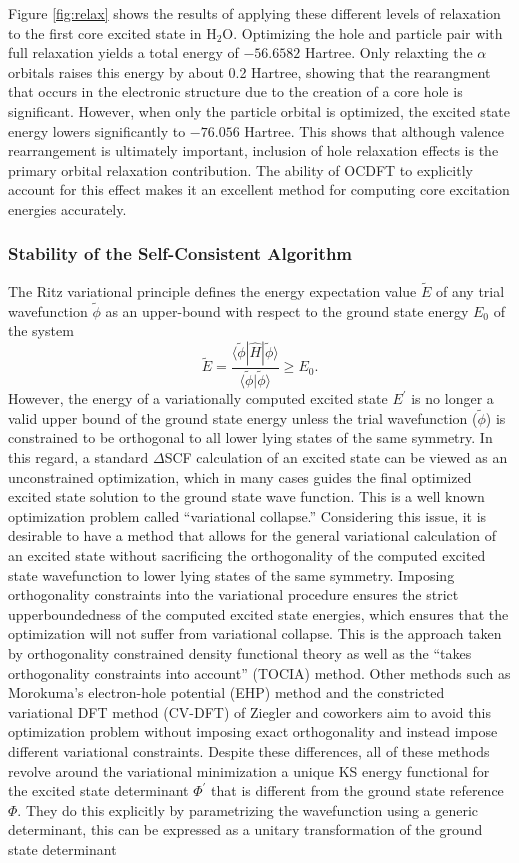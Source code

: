 \documentclass[final]{emory}
\begin{document}
Figure \ref{fig:relax} shows the results of applying these different levels of relaxation to the first core excited state in H$_2$O. Optimizing the hole and particle pair with full relaxation yields a total energy of $- 56.6582$ Hartree. Only relaxting the $\alpha$ orbitals raises this energy by about 0.2 Hartree, showing that the rearangment that occurs in the electronic structure due to the creation of a core hole is significant. However, when only the particle orbital is optimized, the excited state energy lowers significantly to $-76.056$ Hartree. This shows that although valence rearrangement is ultimately important, inclusion of hole relaxation effects is the primary orbital relaxation contribution. The ability of OCDFT to explicitly account for this effect makes it an excellent method for computing core excitation energies accurately. 
\subsubsection{Stability of the Self-Consistent Algorithm}
The Ritz variational principle defines the energy expectation value $\tilde{E}$ of any trial wavefunction $\tilde{\phi}$ as an upper-bound with respect to the ground state energy $E_0$ of the system
\begin{equation}
\tilde{E} = \frac{\langle \tilde{\phi}| \hat{H} | \tilde{\phi}\rangle}{\langle\tilde{\phi}|\tilde{\phi}\rangle} \geq E_0.
\end{equation} 
However, the energy of a variationally computed excited state $E^{\prime}$ is no longer a valid upper bound of the ground state energy unless the trial wavefunction ($\tilde{\phi}$) is constrained to be orthogonal to all lower lying states of the same symmetry. In this regard, a standard $\Delta$SCF calculation of an excited state can be viewed as an unconstrained optimization, which in many cases guides the final optimized excited state solution to the ground state wave function. This is a well known optimization problem called ``variational collapse.'' Considering this issue, it is desirable to have a method that allows for the general variational calculation of an excited state without sacrificing the orthogonality of the computed excited state wavefunction to lower lying states of the same symmetry. Imposing orthogonality constraints into the variational procedure ensures the strict upperboundedness of the computed excited state energies, which ensures that the optimization will not suffer from variational collapse. This is the approach taken by orthogonality constrained density functional theory as well as the ``takes orthogonality constraints into account'' (TOCIA) method. Other methods such as Morokuma's electron-hole potential (EHP) method and the constricted variational DFT method (CV-DFT) of Ziegler and coworkers aim to avoid this optimization problem without imposing exact orthogonality and instead impose different variational constraints. Despite these differences, all of these methods revolve around the variational minimization a unique KS energy functional for the excited state determinant $\Phi^{\prime}$ that is different from the ground state reference $\Phi$. They do this explicitly by parametrizing the wavefunction using a generic determinant, this can be expressed as a unitary transformation of the ground state determinant
\end{document}
